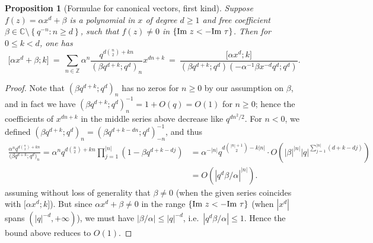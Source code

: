 \documentclass[reqno,11pt]{amsart}
\newtheorem{proposition}[theorem]{Proposition}
\theoremstyle{definition}
\theoremstyle{remark}
\numberwithin{equation}{section}
\newcommand{\Z}{\mathbb{Z}}
\newcommand{\C}{\mathbb{C}}
\renewcommand{\Im}{\textnormal{Im}\ }
\newcommand{\vect}[2]{\big[{#1};{#2}\big]}
\begin{document}
\begin{proposition}[Formulae for canonical vectors, first kind] \label{prop:exact-formulae-kind1}
Suppose $f(z) = \alpha x^d + \beta$ is a polynomial in $x$ of degree $d \ge 1$ and free coefficient $\beta \in \C \setminus \left\{ q^{-n} : n \ge d \right\}$, such that $f(z) \neq 0$ in $\left\{\Im z < -\Im \tau\right\}$. Then for $0 \le k < d$, one has
\begin{equation} \label{eq:kind1}
    \vect{\alpha x^d + \beta}{k}
    \ =\
    \sum_{n \in \Z} \alpha^n \frac{q^{d\binom{n}{2}+kn}}{\left(\beta q^{d+k}; q^d\right)_n} x^{dn+k}
    \ =\
    \frac{\vect{\alpha x^d}{k}}{\left(\beta q^{d+k}; q^d \right) \left(-\alpha^{-1}\beta x^{-d} q^d; q^d \right)}.
\end{equation}
\end{proposition}
\begin{proof}
Note that $\left(\beta q^{d+k}; q^d\right)_n$ has no zeros for $n \ge 0$ by our assumption on $\beta$, and in fact we have $\left(\beta q^{d+k}; q^d\right)_n^{-1} = 1 + O(q) = O(1)$ for $n \ge 0$; hence the coefficients of $x^{dn+k}$ in the middle series above decrease like $q^{dn^2/2}$. For $n < 0$, we defined $\left(\beta q^{d+k}; q^d\right)_n = \left(\beta q^{d+k-dn}; q^d\right)_{-n}^{-1}$, and thus 
\[
\begin{aligned}
    \frac{\alpha^n q^{d\binom{n}{2}+kn}}{\big(\beta q^{d+k}; q^d \big)_n} =
    \alpha^n q^{d\binom{n}{2}+kn}
    \prod_{j=1}^{|n|} \left(1 - \beta q^{d+k-dj}\right)
    &=
    \alpha^{-|n|} q^{d\binom{|n|+1}{2}-k|n|} \cdot
    O\left(|\beta|^{|n|} |q|^{\sum_{j=1}^{|n|} (d+k-dj)} \right)
    \\
    &=
    O\left(|q^d\beta/\alpha|^{|n|} \right).
\end{aligned}
\]
assuming without loss of generality that $\beta \neq 0$ (when the given series coincides with $\vect{\alpha x^d}{k}$). But since $\alpha x^d + \beta \neq 0$ in the range $\{\Im z < -\Im \tau\}$ (when $|x^d|$ spans $\left(|q|^{-d}, +\infty\right)$), we must have $|\beta/\alpha| \le |q|^{-d}$, i.e.\ $|q^d \beta / \alpha| \le 1$. Hence the bound above reduces to $O(1)$.


\end{proof}
\end{document}
